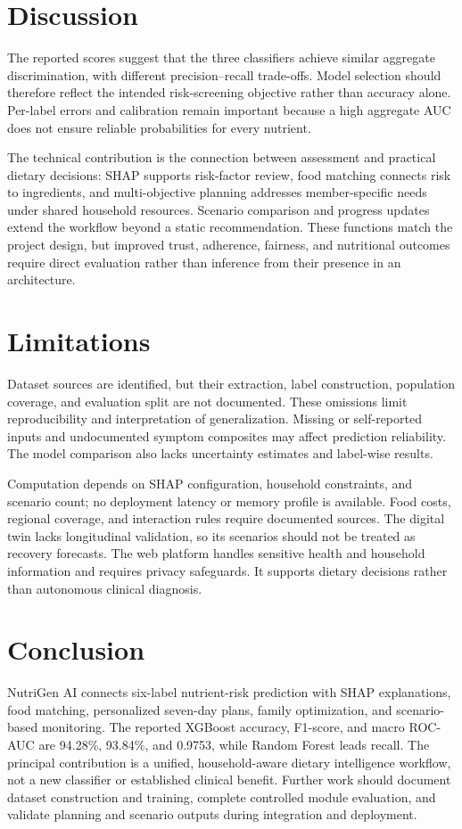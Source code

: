 \documentclass[conference]{IEEEtran}
\begin{document}
\section{Discussion}
The reported scores suggest that the three classifiers achieve similar aggregate discrimination, with different precision--recall trade-offs. Model selection should therefore reflect the intended risk-screening objective rather than accuracy alone. Per-label errors and calibration remain important because a high aggregate AUC does not ensure reliable probabilities for every nutrient.

The technical contribution is the connection between assessment and practical dietary decisions: SHAP supports risk-factor review, food matching connects risk to ingredients, and multi-objective planning addresses member-specific needs under shared household resources. Scenario comparison and progress updates extend the workflow beyond a static recommendation. These functions match the project design, but improved trust, adherence, fairness, and nutritional outcomes require direct evaluation rather than inference from their presence in an architecture.

\section{Limitations}
Dataset sources are identified, but their extraction, label construction, population coverage, and evaluation split are not documented. These omissions limit reproducibility and interpretation of generalization. Missing or self-reported inputs and undocumented symptom composites may affect prediction reliability. The model comparison also lacks uncertainty estimates and label-wise results.

Computation depends on SHAP configuration, household constraints, and scenario count; no deployment latency or memory profile is available. Food costs, regional coverage, and interaction rules require documented sources. The digital twin lacks longitudinal validation, so its scenarios should not be treated as recovery forecasts. The web platform handles sensitive health and household information and requires privacy safeguards. It supports dietary decisions rather than autonomous clinical diagnosis.

\section{Conclusion}
NutriGen AI connects six-label nutrient-risk prediction with SHAP explanations, food matching, personalized seven-day plans, family optimization, and scenario-based monitoring. The reported XGBoost accuracy, F1-score, and macro ROC-AUC are 94.28\%, 93.84\%, and 0.9753, while Random Forest leads recall. The principal contribution is a unified, household-aware dietary intelligence workflow, not a new classifier or established clinical benefit. Further work should document dataset construction and training, complete controlled module evaluation, and validate planning and scenario outputs during integration and deployment.
\end{document}
